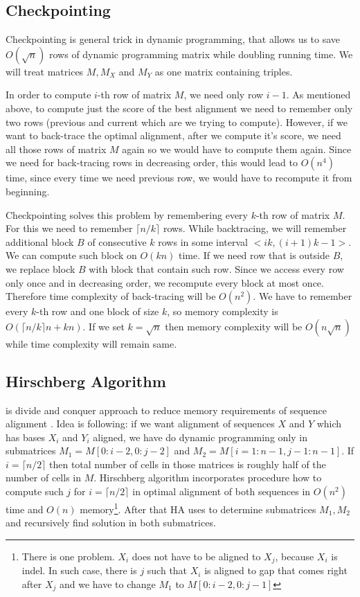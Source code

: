 \subsection{Checkpointing}

Checkpointing is general trick in dynamic programming, that allows us to save
$O(\sqrt n)$ rows of dynamic programming matrix while doubling running time.
We will treat matrices $M,M_X$ and $M_Y$ as one matrix containing triples.

In order to compute $i$-th row of matrix $M$, we need only row
$i-1$. As mentioned above, to compute just the score of the best alignment we
need to remember only two rows (previous and current which are we trying to
compute). However, if we want to back-trace the optimal alignment, after we
compute it's score, we need all those rows of matrix $M$ again so we would have
to compute them again. Since we need for back-tracing rows in decreasing order,
this would lead to $O(n^4)$ time, since every time we need previous row, we
would have to recompute it from beginning.

Checkpointing solves this problem by remembering every $k$-th row of matrix $M$.
For this we need to remember $\lceil n/k\rceil$ rows.
While backtracing, we will remember additional block $B$ of consecutive $k$ rows in
some interval $<ik,(i+1)k-1>$. We can compute such block on $O(kn)$ time. 
If we need row that is outside $B$, we replace block $B$ with block that contain
such row. Since we access every row only once and in decreasing order, we
recompute every block at most once. Therefore time complexity of back-tracing
will be $O(n^2)$. We have to remember every $k$-th row and one block of size
$k$, so memory complexity is $O(\lceil n/k\rceil n+ kn)$. If we set $k=\sqrt n$
then memory complexity will be $O(n\sqrt n)$ while time complexity will remain
same.


\subsection{Hirschberg Algorithm}

 is divide and conquer approach to reduce
memory requirements of sequence alignment \cite{Hirschberg1975}. Idea is
following: if we want alignment of sequences $X$ and $Y$ which has bases $X_i$
and $Y_i$ aligned, we have do dynamic programming only in submatrices
$M_1=M[0:i-2,0:j-2]$ and $M_2=M[i=1:n-1,j-1:n-1]$. If $i=\lceil n/2\rceil$ then
total number of cells in those matrices is roughly half of the number of cells
in $M$. Hirschberg algorithm incorporates procedure how to compute such $j$ for
$i=\lceil n/2\rceil$ in optimal alignment of both sequences in $O(n^2)$ time and
$O(n)$ memory\footnote{There is one problem. $X_i$ does not have to be aligned
to $X_j$, because $X_i$ is indel. In such case, there is $j$ such that $X_i$ is
aligned to gap that comes right after $X_j$ and we have to change $M_1$ to
$M[0:i-2,0:j-1]$}. After that HA uses to determine submatrices $M_1,M_2$ and
recursively find solution in both submatrices.

